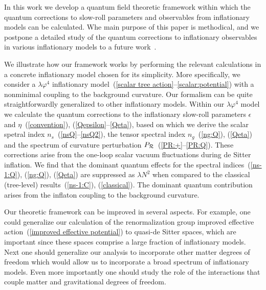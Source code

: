 In this work we develop a quantum field theoretic framework within which
the quantum corrections to slow-roll parameters and
observables from inflationary models can be calculated.
Whe main purpose of this paper is methodical, and we postpone a detailed study
of the quantum corrections to inflationary observables in various
inflationary models to a future work~\cite{ProkopecBilandzic}.

 We illustrate how our framework works by performing the relevant calculations
in a concrete inflationary model chosen for its simplicity.
More specifically, we consider a $\lambda\varphi^4$ inflationary
model~(\ref{scalar tree action}--\ref{scalar:potential})
with a nonminimal coupling to the background curvature.
Our formalism can be quite straightforwardly generalized to other
inflationary models. Within our
$\lambda\varphi^4$ model we calculate the quantum corrections to
the inflationary slow-roll parameters $\epsilon$ and
$\eta$~(\ref{convention}), (\ref{Qepsilon}--\ref{Qeta}),
based on which we derive the scalar spetral index
$n_s$~(\ref{nsQ}--\ref{nsQ2}),
the tensor spectral index $n_g$~(\ref{ng:Q}), (\ref{Qeta})
and the spectrum of curvature perturbation
${P}_{\cal R}$~(\ref{PR:+}--\ref{PR:Q}).
These corrections arise from the one-loop scalar vacuum fluctuations
during de Sitter inflation.
We find that the dominant quantum effects
for the spectral indices~(\ref{ns-1:Q}), (\ref{ng:Q}), (\ref{Qeta})
are suppressed as $\lambda N^2$
when compared to the classical (tree-level) results~(\ref{ns-1:C}),
(\ref{classical}). The dominant quantum contribution
arises from the inflaton coupling to the background curvature.

 Our theoretic framework can be improved in several aspects.
For example, one could generalize our calculation of the renormalization
group improved effective action~(\ref{improved effective potential})
to quasi-de Sitter spaces, which are important since these spaces
comprise a large fraction of inflationary models.
Next one should generalize our analysis to incorporate
other matter degrees of freedom which would allow us to
incorporate a broad spectrum of inflationary models.
Even more importantly one should study the role
of the interactions that couple matter and gravitational degrees of freedom.

